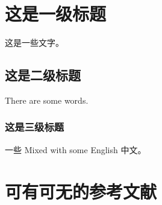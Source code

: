 \documentclass[UTF8,zihao=-4,linespread=1.5]{ctexart}
\begin{document}
\section{这是一级标题}
\label{sec:this_is_a_section}

这是一些文字。

\subsection{这是二级标题}
\label{subsec:this_is_a_subsection}

There are some words.

\subsubsection{这是三级标题}
\label{subsubsec:this_is_a_subsubsection}

一些 Mixed with some English 中文。

\section*{可有可无的参考文献}
\label{sec:references}
\end{document}
